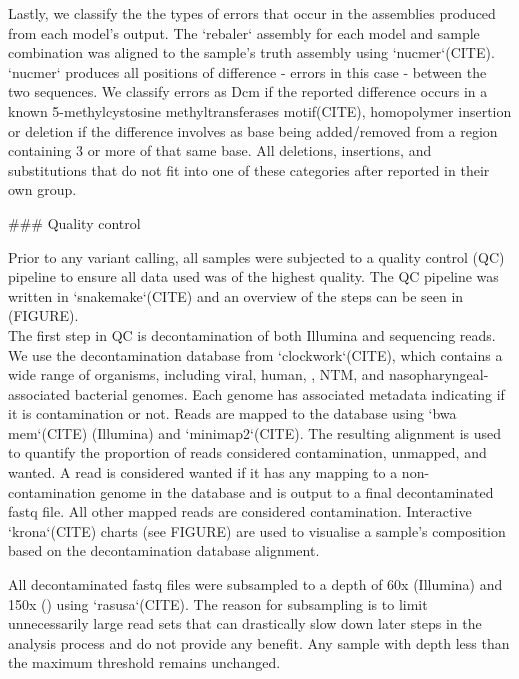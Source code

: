 \begin{markdown}
Lastly, we classify the the types of errors that occur in the assemblies produced from each model's output. The `rebaler` assembly for each model and sample combination was aligned to the sample's truth assembly using `nucmer`(CITE). `nucmer` produces all positions of difference - errors in this case - between the two sequences. We classify errors as Dcm if the reported difference occurs in a known 5-methylcystosine methyltransferases motif(CITE), homopolymer insertion or deletion if the difference involves as base being added/removed from a region containing 3 or more of that same base. All deletions, insertions, and substitutions that do not fit into one of these categories after reported in their own group.


### Quality control \label{sec:ch2-qc}

Prior to any variant calling, all samples were subjected to a quality control (QC) pipeline to ensure all data used was of the highest quality. The QC pipeline was written in `snakemake`(CITE) and an overview of the steps can be seen in (FIGURE). \\
The first step in QC is decontamination of both Illumina and \ont{} sequencing reads. We use the decontamination database from `clockwork`(CITE), which contains a wide range of organisms, including viral, human, \mtb{}, NTM, and nasopharyngeal-associated bacterial genomes. Each genome has associated metadata indicating if it is contamination or not. Reads are mapped to the database using `bwa mem`(CITE) (Illumina) and `minimap2`(CITE). The resulting alignment is used to quantify the proportion of reads considered contamination, unmapped, and wanted. A read is considered wanted if it has any mapping to a non-contamination genome in the database and is output to a final decontaminated fastq file. All other mapped reads are considered contamination. Interactive `krona`(CITE) charts (see FIGURE) are used to visualise a sample's composition based on the decontamination database alignment.  

All decontaminated fastq files were subsampled to a depth of 60x (Illumina) and 150x (\ont{}) using `rasusa`(CITE). The reason for subsampling is to limit unnecessarily large read sets that can drastically slow down later steps in the analysis process and do not provide any benefit. Any sample with depth less than the maximum threshold remains unchanged.  


\end{markdown}
